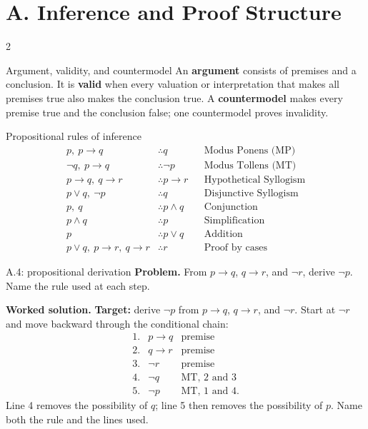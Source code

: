 \documentclass[10pt]{article}
\newcommand{\term}[1]{\textbf{\color{CoreNavy}#1}}
\begin{document}
\small

\section*{A. Inference and Proof Structure}
\begin{multicols}{2}
\begin{definitionbox}{Argument, validity, and countermodel}
An \term{argument} consists of premises and a conclusion. It is \term{valid}
when every valuation or interpretation that makes all premises true also makes
the conclusion true. A \term{countermodel} makes every premise true and the
conclusion false; one countermodel proves invalidity.
\end{definitionbox}

\begin{definitionbox}{Propositional rules of inference}
\begin{align*}
p,\ p\to q&\therefore q &&\text{Modus Ponens (MP)}\\
\neg q,\ p\to q&\therefore\neg p &&\text{Modus Tollens (MT)}\\
p\to q,\ q\to r&\therefore p\to r &&\text{Hypothetical Syllogism}\\
p\lor q,\ \neg p&\therefore q &&\text{Disjunctive Syllogism}\\
p,\ q&\therefore p\land q &&\text{Conjunction}\\
p\land q&\therefore p &&\text{Simplification}\\
p&\therefore p\lor q &&\text{Addition}\\
p\lor q,\ p\to r,\ q\to r&\therefore r &&\text{Proof by cases}
\end{align*}
\end{definitionbox}

\begin{workedbox}{A.4: propositional derivation}
\textbf{Problem.} From $p\to q$, $q\to r$, and $\neg r$, derive $\neg p$. Name the rule used at each step.

\textbf{Worked solution.} \textbf{Target:} derive $\neg p$ from $p\to q$, $q\to r$, and $\neg r$.
Start at $\neg r$ and move backward through the conditional chain:
\[
\begin{array}{rll}
1.&p\to q&\text{premise}\\
2.&q\to r&\text{premise}\\
3.&\neg r&\text{premise}\\
4.&\neg q&\text{MT, 2 and 3}\\
5.&\neg p&\text{MT, 1 and 4.}
\end{array}
\]
Line 4 removes the possibility of $q$; line 5 then removes the possibility of
$p$. Name both the rule and the lines used.


\end{workedbox}
\end{multicols}
\end{document}
